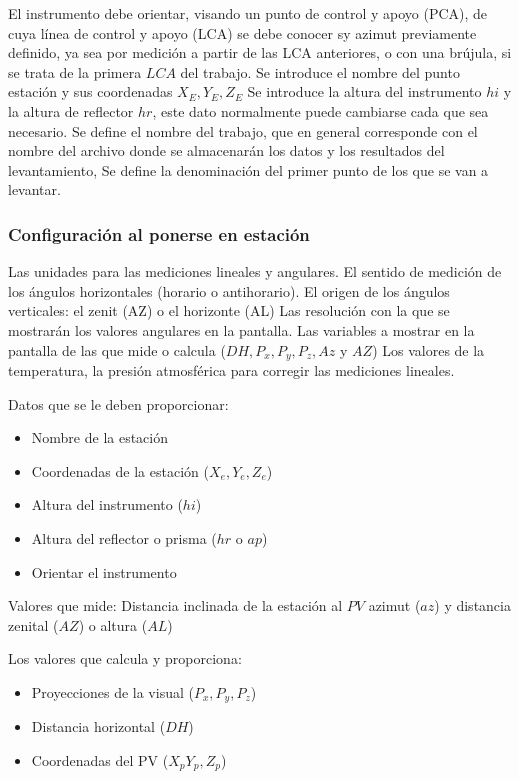 El instrumento debe orientar, visando un punto de control y apoyo (PCA), de cuya línea de control y apoyo (LCA) se debe conocer sy azimut previamente definido, ya sea por medición a partir de las LCA anteriores, o con una brújula, si se trata de la primera $LCA$ del trabajo.
Se introduce el nombre del punto estación y sus coordenadas $X_E,Y_E,Z_E$
Se introduce la altura del instrumento $hi$ y la altura de reflector $hr$, este dato normalmente puede cambiarse cada que sea necesario.
Se define el nombre del trabajo, que en general corresponde con el nombre del archivo donde se almacenarán los datos y los resultados del levantamiento,
Se define la denominación del primer punto de los que se van a levantar.

\subsubsection{Configuración al ponerse en estación}

Las unidades para las mediciones lineales y angulares. El sentido de medición de los ángulos horizontales (horario o antihorario).
El origen de los ángulos verticales: el zenit (AZ) o el horizonte (AL)
Las resolución con la que se mostrarán los valores angulares en la pantalla.
Las variables a mostrar en la pantalla de las que mide o calcula ($DH,P_x,P_y,P_z,Az$ y $AZ$)
Los valores de la temperatura, la presión atmosférica para corregir las mediciones lineales.

Datos que se le deben proporcionar:
\begin{itemize}
    \item Nombre de la estación
    \item Coordenadas de la estación ($X_e,Y_e,Z_e$)
    \item Altura del instrumento ($hi$)
    \item Altura del reflector o prisma ($hr$ o $ap$)
    \item Orientar el instrumento
\end{itemize}
Valores que mide:
Distancia inclinada de la estación al $PV$ azimut ($az$) y distancia zenital ($AZ$) o altura ($AL$)

Los valores que calcula y proporciona:
\begin{itemize}
    \item Proyecciones de la visual ($P_x,P_y,P_z$)
    \item Distancia horizontal ($DH$)
    \item Coordenadas del PV ($X_pY_p,Z_p$)
\end{itemize}

